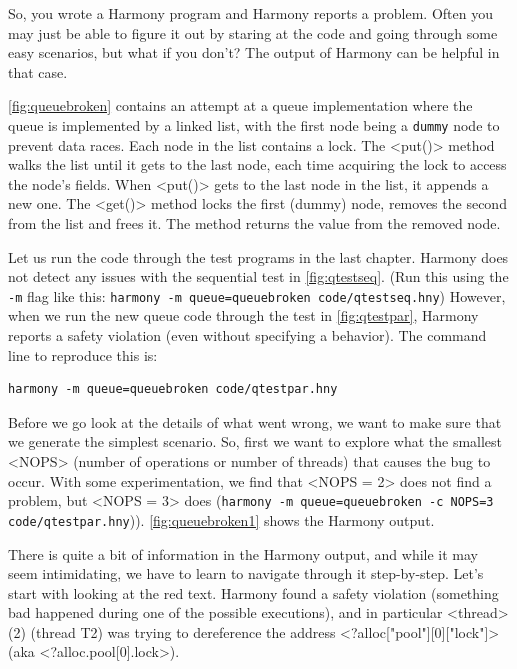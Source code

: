 \documentclass{report}
\newenvironment{code}{
\tcolorbox
}{
\endtcolorbox
}
\begin{document}
So, you wrote a Harmony program and Harmony reports a problem.
Often you may just be able to figure it out by staring at the code and
going through some easy scenarios, but what if you don't?
The output of Harmony can be helpful in that case.

\autoref{fig:queuebroken} contains an attempt at a queue implementation
where the queue is implemented by a linked list, with the first node
being a \texttt{dummy} node to prevent data races.  Each node in the
list contains a lock.  The <{put()}> method walks the list until
it gets to the last node, each time acquiring the lock to access the
node's fields.  When <{put()}> gets to the last node in the list,
it appends a new one.  The <{get()}> method locks the first (dummy)
node, removes the second from the list and frees it.  The method returns
the value from the removed node.

Let us run the code through the test programs in the last
chapter.  Harmony does not detect any issues with the sequential test
in \autoref{fig:qtestseq}.
(Run this using the \texttt{-m} flag like this:
\texttt{harmony -m queue=queuebroken code/qtestseq.hny})
However, when we run
the new queue code through the test in \autoref{fig:qtestpar}, Harmony
reports a safety violation (even without specifying a behavior).
The command line to reproduce this is:

\begin{code}
\begin{verbatim}
harmony -m queue=queuebroken code/qtestpar.hny
\end{verbatim}
\end{code}

Before we go look at the details of what went wrong, we want to make
sure that we generate the simplest scenario.  So, first we want to explore
what the smallest <{NOPS}> (number of operations or number of
threads) that causes the bug to occur.  With some experimentation,
we find that <{NOPS = 2}> does not find a problem, but
<{NOPS = 3}> does
(\texttt{harmony -m queue=queuebroken -c NOPS=3 code/qtestpar.hny})).
\autoref{fig:queuebroken1} shows the Harmony output.

There is quite a bit of information in the Harmony output, and while
it may seem intimidating, we have to learn to navigate through it
step-by-step.
Let's start with looking at the red text.  Harmony found a safety
violation (something bad happened during one of the possible executions),
and in particular <{thread}>(2) (thread T2) was trying to dereference
the address <{?alloc["pool"][0]["lock"]}> (aka <{?alloc.pool[0].lock}>).
\end{document}
